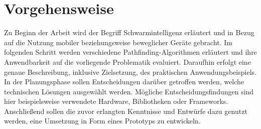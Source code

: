 \section{Vorgehensweise}
Zu Beginn der Arbeit wird der Begriff Schwarmintelligenz erläutert und in Bezug auf die Nutzung mobiler beziehungsweise beweglicher Geräte gebracht. Im folgenden Schritt werden verschiedene Pathfinding-Algorithmen erläutert und ihre Anwendbarkeit auf die vorliegende Problematik evaluiert. Daraufhin erfolgt eine genaue Beschreibung, inklusive Zielsetzung, des praktischen Anwendungsbeispiels.   
In der Planungsphase sollen Entscheidungen darüber getroffen werden, welche technischen Lösungen ausgewählt werden. Mögliche Entscheidungsfindungen sind hier beispielsweise verwendete Hardware, Bibliotheken oder Frameworks. Anschließend sollen die zuvor erlangten Kenntnisse und Entwürfe dazu genutzt werden, eine Umsetzung in Form eines Prototyps zu entwickeln.
